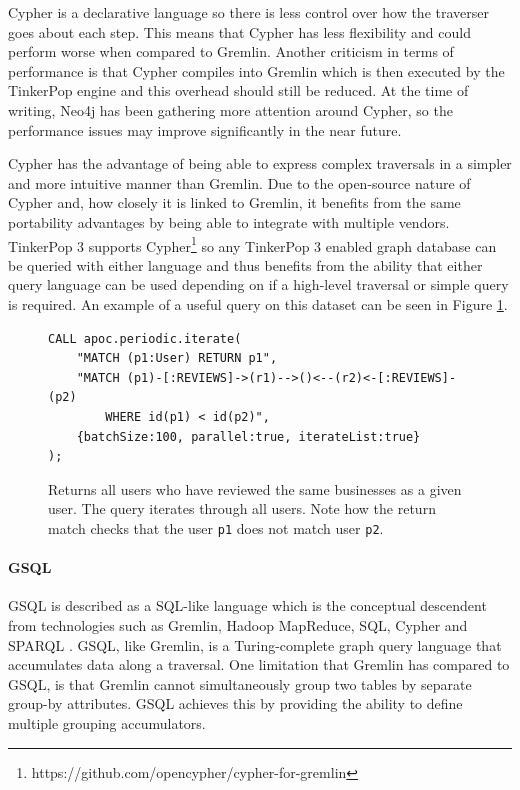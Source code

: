 Cypher is a declarative language so there is less control over how the traverser goes about each step. This means that Cypher has less flexibility and could perform worse when compared to Gremlin. Another criticism in terms of performance is that Cypher compiles into Gremlin which is then executed by the TinkerPop engine \cite{backtothefuture} and this overhead should still be reduced. At the time of writing, Neo4j has been gathering more attention around Cypher, so the performance issues may improve significantly in the near future.

Cypher has the advantage of being able to express complex traversals in a simpler and more intuitive manner than Gremlin. Due to the open-source nature of Cypher and, how closely it is linked to Gremlin, it benefits from the same portability advantages by being able to integrate with multiple vendors. TinkerPop 3 supports Cypher\footnote{https://github.com/opencypher/cypher-for-gremlin} so any TinkerPop 3 enabled graph database can be queried with either language and thus benefits from the ability that either query language can be used depending on if a high-level traversal or simple query is required. An example of a useful query on this dataset can be seen in Figure \ref{lst:cypher-example-1}.

\begin{figure}[h]
    \centering
    \begin{verbatim}
CALL apoc.periodic.iterate(
    "MATCH (p1:User) RETURN p1",
    "MATCH (p1)-[:REVIEWS]->(r1)-->()<--(r2)<-[:REVIEWS]-(p2)
        WHERE id(p1) < id(p2)",
    {batchSize:100, parallel:true, iterateList:true}
);
    \end{verbatim}
    \caption{Returns all users who have reviewed the same businesses as a given user. The query iterates through all users. Note how the return match checks that the user \texttt{p1} does not match user \texttt{p2}.}
    \label{lst:cypher-example-1}
\end{figure}

\paragraph{GSQL}

GSQL is described as a SQL-like language which is the conceptual descendent from technologies such as Gremlin, Hadoop MapReduce, SQL, Cypher and SPARQL \cite{gsql-tigergraph}. GSQL, like Gremlin, is a Turing-complete graph query language that accumulates data along a traversal. One limitation that Gremlin has compared to GSQL, is that Gremlin cannot simultaneously group two tables by separate group-by attributes. GSQL achieves this by providing the ability to define multiple grouping accumulators.

